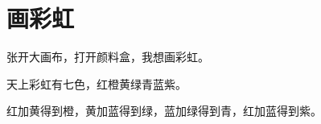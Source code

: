 \documentclass[12pt,UTF-8,openany]{ctexbook}
\begin{document}
\begin{center}
    
\end{center}


\hanzibox{}\hanzibox{}\hanzibox{}\hanzibox{}\hspace{1em}\hanzibox{}\hanzibox{}\hanzibox{}\hanzibox{}

\hanzibox{}\hanzibox{}\hanzibox{}\hanzibox{}\hspace{1em}\hanzibox{}\hanzibox{}\hanzibox{}\hanzibox{}

\hanzibox{}\hanzibox{}\hanzibox{}\hanzibox{}\hspace{1em}\hanzibox{}\hanzibox{}\hanzibox{}\hanzibox{}

\hanzibox{}\hanzibox{}\hanzibox{}\hanzibox{}\hspace{1em}\hanzibox{}\hanzibox{}\hanzibox{}\hanzibox{}






\chapter{画彩虹}

\begin{large}
    
    张开大画布，打开颜料盒，我想画彩虹。
    
    天上彩虹有七色，红橙黄绿青蓝紫。
    
    红加黄得到橙，黄加蓝得到绿，蓝加绿得到青，红加蓝得到紫。
    
\end{large}


\clearpage

\begin{center}
    
\end{center}


\hanzibox{}\hanzibox{}\hanzibox{}\hanzibox{}\hspace{1em}\hanzibox{}\hanzibox{}\hanzibox{}\hanzibox{}

\hanzibox{}\hanzibox{}\hanzibox{}\hanzibox{}\hspace{1em}\hanzibox{}\hanzibox{}\hanzibox{}\hanzibox{}
\end{document}
